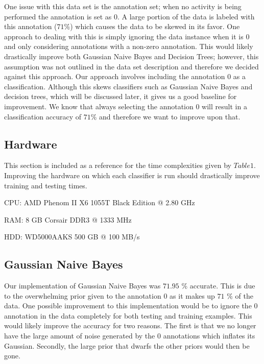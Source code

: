 \documentclass[twoside]{article}
\begin{document}
\begin{multicols}{2}
One issue with this data set is the annotation set; when no activity is being performed the annotation is set as $0$.  A large portion of the data is labeled with this annotation ($71\%$) which causes the data to be skewed in its favor.  One approach to dealing with this is simply ignoring the data instance when it is $0$ and only considering annotations with a non-zero annotation.  This would likely drastically improve both Gaussian Naive Bayes and Decision Trees; however, this assumption was not outlined in the data set description and therefore we decided against this approach.
Our approach involves including the annotation $0$ as a classification.  Although this skews classifiers such as Gaussian Naive Bayes and decision trees, which will be discussed later, it gives us a good baseline for improvement.  We know that always selecting the annotation $0$ will result in a classification accuracy of $71\%$ and therefore we want to improve upon that.

\subsection{Hardware}
This section is included as a reference for the time complexities given by $Table 1$.  Improving the hardware on which each classifier is run should drastically improve training and testing times.
\begin{compactitem}
\item CPU: AMD Phenom II X6 1055T Black Edition @ 2.80 GHz
\item RAM: 8 GB Corsair DDR3 @ 1333 MHz
\item HDD: WD5000AAKS 500 GB @ 100 MB/s
\end{compactitem}

\subsection{Gaussian Naive Bayes}
Our implementation of Gaussian Naive Bayes was $71.95$ \% accurate.  This is due to the overwhelming prior given to the annotation $0$ as it makes up $71$ \% of the data.  One possible improvement to this implementation would be to ignore the $0$ annotation in the data completely for both testing and training examples.  This would likely improve the accuracy for two reasons. The first is that we no longer have the large amount of noise generated by the $0$ annotations which inflates its Gaussian. Secondly, the large prior that dwarfs the other priors would then be gone.


\end{multicols}
\end{document}
